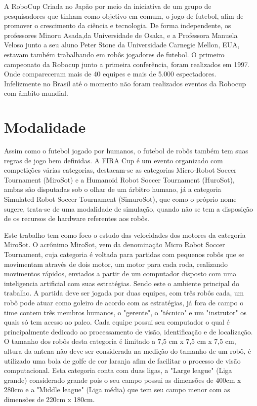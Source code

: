 \documentclass[a4paper,12pt,portuguese]{ufms-cpcx}
\begin{document}
A RoboCup Criada no Japão por meio da iniciativa de um grupo de pesquisadores que tinham como objetivo em comum, o jogo de futebol, afim de promover o crescimento da ciência e tecnologia. De forma independente, os professores Minoru Asada,da Universidade de Osaka, e a Professora Manuela Veloso junto a seu aluno Peter Stone da Universidade Carnegie Mellon, EUA, estavam também trabalhando em robôs jogadores de futebol.
O primeiro campeonato da Robocup junto a primeira conferência, foram realizados em 1997. Onde compareceram mais de 40 equipes e mais de 5.000 espectadores. Infelizmente no Brasil até o momento não foram realizados eventos da Robocup com âmbito mundial.

\section{Modalidade} \label{modalidade}
Assim como o futebol jogado por humanos, o futebol de robôs também tem suas regras de jogo bem definidas. A FIRA Cup é um evento organizado com competições várias categorias, destacam-se as categorias Micro-Robot Soccer Tournament (MiroSot) e a Humanoid Robot Soccer Tournament (HuroSot), ambas são disputadas sob o olhar de um árbitro humano, já a categoria Simulated Robot Soccer Tournament (SimuroSot), que como o próprio nome sugere, trata-se de uma modalidade de simulação, quando não se tem a disposição de os recursos de hardware referentes aos robôs.

Este trabalho tem como foco o estudo das velocidades dos motores da categoria MiroSot. O acrônimo MiroSot, vem da denominação Micro Robot Soccer Tournament, cuja categoria é voltada para partidas com pequenos robôs que se movimentam através de dois motor, um motor para cada roda, realizando movimentos rápidos, enviados a partir de um computador disposto com uma inteligencia artificial com suas estratégias. Sendo este o ambiente principal do trabalho.
A partida deve ser jogada por duas equipes, com três robôs cada, um robô pode atuar como goleiro de acordo com as estratégias, já fora de campo o time contem três membros humanos, o "gerente", o "técnico" e um "instrutor" os quais só tem acesso ao palco. Cada equipe possui seu computador o qual é principalmente dedicado ao processamento de visão, identificação e de localização.  
O tamanho dos robôs desta categoria é limitado a 7,5 cm x 7,5 cm x 7,5 cm, altura da antena não deve ser considerada na medição do tamanho de um robô, é utilizado uma bola de golfe de cor laranja afim de facilitar o processo de visão computacional.
Esta categoria conta com duas ligas, a "Large league" (Liga grande) considerado grande pois o seu campo possui as dimensões de 400cm x 280cm e a "Middle league" (Liga média) que tem seu campo menor com as dimensões de 220cm x 180cm.
\end{document}
